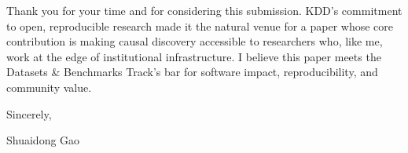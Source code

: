 \documentclass[11pt]{article}
\begin{document}
\bigskip

\noindent Thank you for your time and for considering this submission. KDD's commitment to open, reproducible research made it the natural venue for a paper whose core contribution is making causal discovery accessible to researchers who, like me, work at the edge of institutional infrastructure. I believe this paper meets the Datasets \& Benchmarks Track's bar for software impact, reproducibility, and community value.

\medskip

\noindent Sincerely,

\medskip

\noindent Shuaidong Gao
\end{document}
